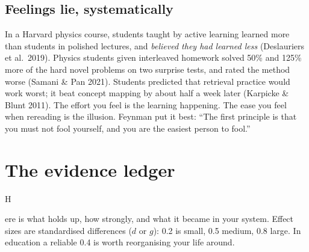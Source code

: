 \documentclass{kaelearn}
\begin{document}
\subsection{Feelings lie, systematically}
In a Harvard physics course, students taught by active learning learned more than students in
polished lectures, and \emph{believed they had learned less} (Deslauriers et al.\ 2019). Physics
students given interleaved homework solved 50\% and 125\% more of the hard novel problems on two
surprise tests, and rated the method worse (Samani \& Pan 2021). Students predicted that
retrieval practice would work worst; it beat concept mapping by about half a week later (Karpicke
\& Blunt 2011). The effort you feel is the learning happening. The ease you feel when rereading
is the illusion. Feynman put it best: ``The first principle is that you must not fool yourself, and
you are the easiest person to fool.''


\section{The evidence ledger}

\opening{H}{ere is} what holds up, how strongly, and what it became in your system. Effect sizes
are standardised differences ($d$ or $g$): 0.2 is small, 0.5 medium, 0.8 large. In education a
reliable 0.4 is worth reorganising your life around.
\end{document}
